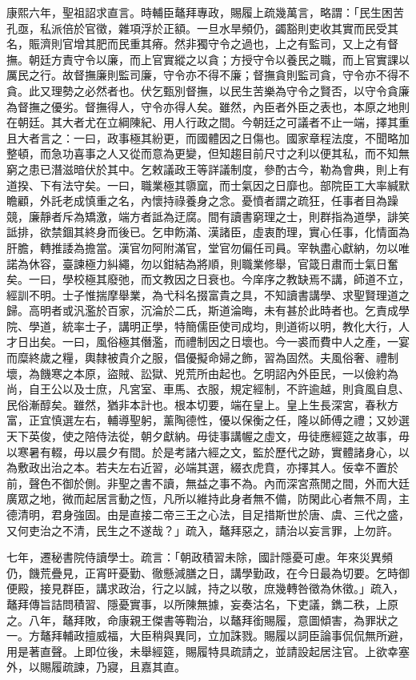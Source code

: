 \begin{pinyinscope}
康熙六年，聖祖詔求直言。時輔臣鼇拜專政，賜履上疏幾萬言，略謂：「民生困苦孔亟，私派倍於官徵，雜項浮於正額。一旦水旱頻仍，蠲豁則吏收其實而民受其名，賑濟則官增其肥而民重其瘠。然非獨守令之過也，上之有監司，又上之有督撫。朝廷方責守令以廉，而上官實縱之以貪；方授守令以養民之職，而上官實課以厲民之行。故督撫廉則監司廉，守令亦不得不廉；督撫貪則監司貪，守令亦不得不貪。此又理勢之必然者也。伏乞甄別督撫，以民生苦樂為守令之賢否，以守令貪廉為督撫之優劣。督撫得人，守令亦得人矣。雖然，內臣者外臣之表也，本原之地則在朝廷。其大者尤在立綱陳紀、用人行政之間。今朝廷之可議者不止一端，擇其重且大者言之：一曰，政事極其紛更，而國體因之日傷也。國家章程法度，不聞略加整頓，而急功喜事之人又從而意為更變，但知趨目前尺寸之利以便其私，而不知無窮之患已潛滋暗伏於其中。乞敕議政王等詳議制度，參酌古今，勒為會典，則上有道揆、下有法守矣。一曰，職業極其隳窳，而士氣因之日靡也。部院臣工大率緘默瞻顧，外託老成慎重之名，內懷持祿養身之念。憂憤者謂之疏狂，任事者目為躁競，廉靜者斥為矯激，端方者詆為迂腐。間有讀書窮理之士，則群指為道學，誹笑詆排，欲禁錮其終身而後已。乞申飭滿、漢諸臣，虛衷酌理，實心任事，化情面為肝膽，轉推諉為擔當。漢官勿阿附滿官，堂官勿偏任司員。宰執盡心獻納，勿以唯諾為休容，臺諫極力糾繩，勿以鉗結為將順，則職業修舉，官箴日肅而士氣日奮矣。一曰，學校極其廢弛，而文教因之日衰也。今庠序之教缺焉不講，師道不立，經訓不明。士子惟揣摩舉業，為弋科名掇富貴之具，不知讀書講學、求聖賢理道之歸。高明者或汎濫於百家，沉淪於二氏，斯道淪晦，未有甚於此時者也。乞責成學院、學道，統率士子，講明正學，特簡儒臣使司成均，則道術以明，教化大行，人才日出矣。一曰，風俗極其僭濫，而禮制因之日壞也。今一裘而費中人之產，一宴而糜終歲之糧，輿隸被貴介之服，倡優擬命婦之飾，習為固然。夫風俗奢、禮制壞，為饑寒之本原，盜賊、訟獄、兇荒所由起也。乞明詔內外臣民，一以儉約為尚，自王公以及士庶，凡宮室、車馬、衣服，規定經制，不許逾越，則貪風自息、民俗漸醇矣。雖然，猶非本計也。根本切要，端在皇上。皇上生長深宮，春秋方富，正宜慎選左右，輔導聖躬，薰陶德性，優以保衡之任，隆以師傅之禮；又妙選天下英俊，使之陪侍法從，朝夕獻納。毋徒事講幄之虛文，毋徒應經筵之故事，毋以寒暑有輟，毋以晨夕有間。於是考諸六經之文，監於歷代之跡，實體諸身心，以為敷政出治之本。若夫左右近習，必端其選，綴衣虎賁，亦擇其人。佞幸不置於前，聲色不御於側。非聖之書不讀，無益之事不為。內而深宮燕閒之間，外而大廷廣眾之地，微而起居言動之恆，凡所以維持此身者無不備，防閑此心者無不周，主德清明，君身強固。由是直接二帝三王之心法，目足措斯世於唐、虞、三代之盛，又何吏治之不清，民生之不遂哉？」疏入，鼇拜惡之，請治以妄言罪，上勿許。

七年，遷秘書院侍讀學士。疏言：「朝政積習未除，國計隱憂可慮。年來災異頻仍，饑荒疊見，正宵旰憂勤、徹懸減膳之日，講學勤政，在今日最為切要。乞時御便殿，接見群臣，講求政治，行之以誠，持之以敬，庶幾轉咎徵為休徵。」疏入，鼇拜傳旨詰問積習、隱憂實事，以所陳無據，妄奏沽名，下吏議，鐫二秩，上原之。八年，鼇拜敗，命康親王傑書等鞫治，以鼇拜銜賜履，意圖傾害，為罪狀之一。方鼇拜輔政擅威福，大臣稍與異同，立加誅戮。賜履以詞臣論事侃侃無所避，用是著直聲。上即位後，未舉經筵，賜履特具疏請之，並請設起居注官。上欲幸塞外，以賜履疏諫，乃寢，且嘉其直。


\end{pinyinscope}
